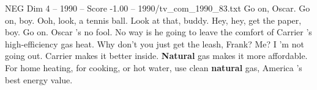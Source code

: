 \begin{textsample}{NEG Dim 4 – 1990 – Score -1.00 – 1990/tv\_com\_1990\_83.txt}  \label{ex:f4_neg_077}
Go on, Oscar.
Go on, boy.
Ooh, look, a tennis ball.
Look at that, buddy.
Hey, hey, get the paper, boy.
Go on.
Oscar 's no fool.
No way is he going to leave the comfort of Carrier 's high-efficiency gas heat.
Why don't you just get the leash, Frank?
Me?
I 'm not going out.
Carrier makes it better inside. \textbf{Natural} gas makes it more affordable.
For home heating, for cooking, or hot water, use clean \textbf{natural} gas, America 's best energy value.

\end{textsample}

